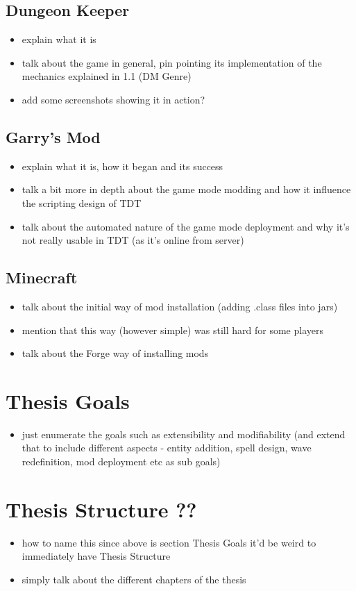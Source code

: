 \subsection{Dungeon Keeper}

\begin{itemize}
    \item explain what it is
    \item talk about the game in general, pin pointing its implementation
        of the mechanics explained in 1.1 (DM Genre)
    \item add some screenshots showing it in action?
\end{itemize}

\subsection{Garry's Mod}

\begin{itemize}
    \item explain what it is, how it began and its success
    \item talk a bit more in depth about the game mode modding and how
        it influence the scripting design of TDT
    \item talk about the automated nature of the game mode deployment and
        why it's not really usable in TDT (as it's online from server)
\end{itemize}

\subsection{Minecraft}

\begin{itemize}
    \item talk about the initial way of mod installation (adding .class files into jars)
    \item mention that this way (however simple) was still hard for some players
    \item talk about the Forge way of installing mods
\end{itemize}

\section{Thesis Goals}

\begin{itemize}
    \item just enumerate the goals such as extensibility and modifiability (and extend that
        to include different aspects - entity addition, spell design, wave redefinition,
        mod deployment etc as sub goals)
\end{itemize}

\section{Thesis Structure ??}

\begin{itemize}
    \item how to name this since above is section Thesis Goals it'd be weird to immediately
        have Thesis Structure
    \item simply talk about the different chapters of the thesis
\end{itemize}
